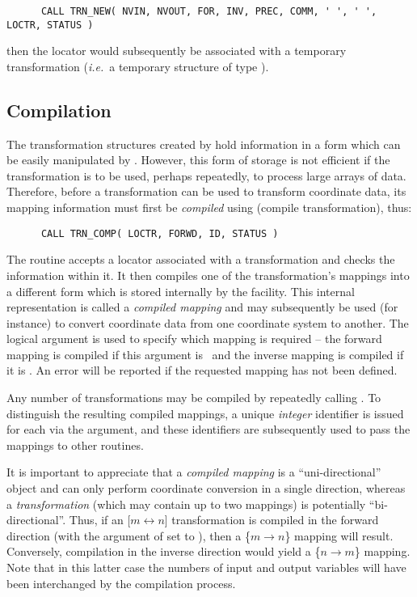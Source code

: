 \begin{verbatim}
      CALL TRN_NEW( NVIN, NVOUT, FOR, INV, PREC, COMM, ' ', ' ', LOCTR, STATUS )
\end{verbatim}

then the locator  would subsequently be associated with a
temporary transformation ({\em i.e.}\ a temporary  structure of
type ). 


\subsection{Compilation}

The transformation structures created by  hold information in
a form which can be easily manipulated by . 
However, this form of storage is not efficient if the transformation is to
be used, perhaps repeatedly, to process large arrays of data. 
Therefore, before a transformation can be used to transform coordinate data,
its mapping information must first be {\em compiled} using 
(compile transformation), thus:

\begin{verbatim}
      CALL TRN_COMP( LOCTR, FORWD, ID, STATUS )
\end{verbatim}

The  routine accepts a locator  associated
with a transformation and checks the information within it.
It then compiles one of the transformation's mappings into a different form
which is stored internally by the  facility. 
This internal representation is called a {\em compiled mapping} and may
subsequently be used (for instance) to convert coordinate data from one
coordinate system to another. 
The logical argument  is used to specify which mapping is 
required -- the forward mapping is compiled if this argument is
\ and the inverse mapping is compiled if it is .
An error will be reported if the requested mapping has not been defined. 

Any number of transformations may be compiled by repeatedly calling
.
To distinguish the resulting compiled mappings, a unique {\em integer}
identifier is issued for each via the  argument, and these
identifiers are subsequently used to pass the mappings to other routines. 

It is important to appreciate that a {\em compiled mapping} is a
``uni-directional'' object and can only perform coordinate conversion in a
single direction, whereas a {\em transformation} (which may contain up to
two mappings) is potentially ``bi-directional''. 
Thus, if an \mbox{[$m \leftrightarrow n$]} transformation is compiled in the
forward direction (with the  argument of  set
to ), then a \mbox{\{$m \rightarrow n$\}} mapping will result. 
Conversely, compilation in the inverse direction would yield a \mbox{\{$n
\rightarrow m$\}} mapping. 
Note that in this latter case the numbers of input and output variables will
have been interchanged by the compilation process. 


